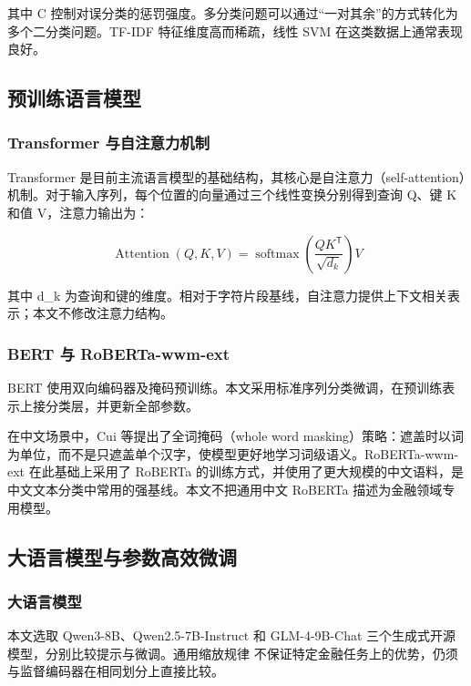 其中 C 控制对误分类的惩罚强度。多分类问题可以通过``一对其余''的方式转化为多个二分类问题。TF-IDF 特征维度高而稀疏，线性 SVM 在这类数据上通常表现良好。

\FloatBarrier\subsection{预训练语言模型}

\subsubsection{Transformer 与自注意力机制}

Transformer\cite{ref25} 是目前主流语言模型的基础结构，其核心是自注意力（self-attention）机制。对于输入序列，每个位置的向量通过三个线性变换分别得到查询 Q、键 K 和值 V，注意力输出为：

\begin{equation}\operatorname{Attention}(Q,K,V)=\operatorname{softmax}\!\left(\frac{QK^{\mathsf T}}{\sqrt{d_k}}\right)V\tag{2-4}\label{eq:2-4}\end{equation}

其中 d\_k 为查询和键的维度。相对于字符片段基线，自注意力提供上下文相关表示；本文不修改注意力结构\cite{ref25}。

\subsubsection{BERT 与 RoBERTa-\allowbreak{}wwm-\allowbreak{}ext}

BERT\cite{ref7} 使用双向编码器及掩码预训练。本文采用标准序列分类微调，在预训练表示上接分类层，并更新全部参数。

在中文场景中，Cui 等\cite{ref9}提出了全词掩码（whole word masking）策略：遮盖时以词为单位，而不是只遮盖单个汉字，使模型更好地学习词级语义。RoBERTa-wwm-ext 在此基础上采用了 RoBERTa 的训练方式，并使用了更大规模的中文语料，是中文文本分类中常用的强基线。本文不把通用中文 RoBERTa 描述为金融领域专用模型。

\FloatBarrier\subsection{大语言模型与参数高效微调}

\subsubsection{大语言模型}

本文选取 Qwen3-8B\cite{ref11}、Qwen2.5-7B-Instruct 和 GLM-4-9B-Chat 三个生成式开源模型，分别比较提示与微调。通用缩放规律\cite{ref26} 不保证特定金融任务上的优势，仍须与监督编码器在相同划分上直接比较。

